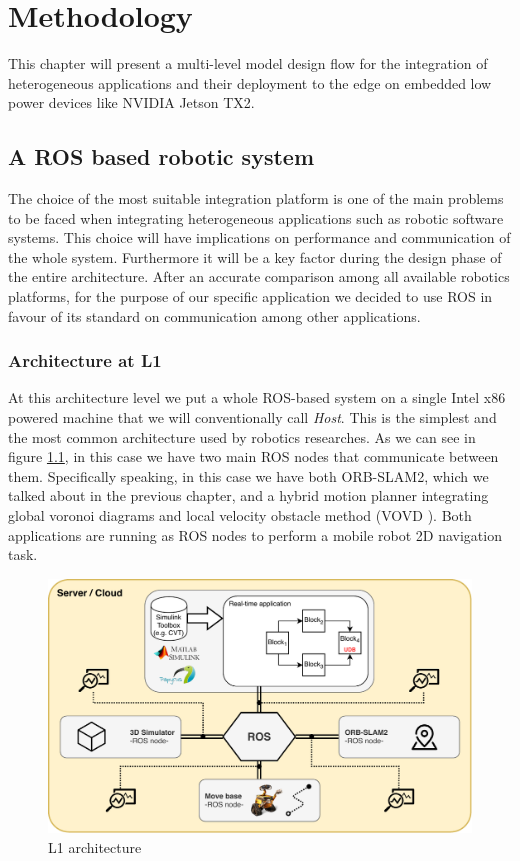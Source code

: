 \chapter{Methodology} \label{chap:methodology}
This chapter will present a multi-level model design flow for the integration of heterogeneous applications and their deployment to the edge on embedded low power devices like NVIDIA Jetson TX2.


\section{A ROS based robotic system}
The choice of the most suitable integration platform is one of the main problems to be faced when integrating heterogeneous applications such as robotic software systems. This choice will have implications on performance and communication of the whole system. Furthermore it will be a key factor during the design phase of the entire architecture.
After an accurate comparison among all available robotics platforms, for the purpose of our specific application we decided to use ROS \cite{ROS} in favour of its standard on communication among other applications.

\subsection{Architecture at L1}
At this architecture level we put a whole ROS-based system on a single Intel x86 powered machine that we will conventionally call \textit{Host}. 
This is the simplest and the most common architecture used by robotics researches. As we can see in figure \ref{fig:l1arch}, in this case we have two main ROS nodes that communicate between them. Specifically speaking, in this case we have both ORB-SLAM2, which we talked about in the previous chapter, and a hybrid motion planner integrating global voronoi diagrams and local velocity obstacle method (VOVD \cite{VOVD}). Both applications are running as ROS nodes to perform a mobile robot 2D navigation task.

\begin{figure}
	\centering
	\includegraphics[width=\textwidth]{images/L1-arch}
	\caption{L1 architecture}
	\label{fig:l1arch}
\end{figure}


